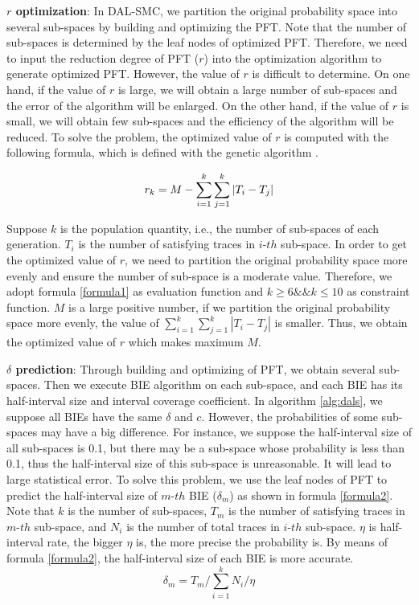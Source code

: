 \textbf{$r$ optimization}: In DAL-SMC, we partition the original probability space into several sub-spaces by building and optimizing the PFT. Note that the number of sub-spaces is determined by the leaf nodes of optimized PFT. Therefore, we need to input the reduction degree of PFT ($r$) into the optimization algorithm to generate optimized PFT. However, the value of $r$ is difficult to determine. On one hand, if the value of $r$ is large, we will obtain a large number of sub-spaces and the error of the algorithm will be enlarged. On the other hand, if the value of $r$ is small, we will obtain few sub-spaces and the efficiency of the algorithm will be reduced. To solve the problem, the optimized value of $r$ is computed with the following formula, which is defined with the genetic algorithm \cite{DBLP:books/daglib/0019871}. 

\begin{equation}
\centering
\label{formula1}
r_k = M - \sum\limits_{i=1}^k \sum\limits_{j=1}^k |T_i - T_j| 
\end{equation}

Suppose $k$ is the population quantity, i.e., the number of sub-spaces of each generation. $T_i$ is the number of satisfying traces in $i$-$th$ sub-space. In order to get the optimized value of $r$, we need to partition the original probability space more evenly and ensure the number of sub-space is a moderate value. Therefore, we adopt formula \ref{formula1} as evaluation function and $k \geq 6 \&\& k \leq 10$ as constraint function. $M$ is a large positive number, if we partition the original probability space more evenly, the value of $\sum\limits_{i=1}^k \sum\limits_{j=1}^k |T_i - T_j|$ is smaller. Thus, we obtain the optimized value of $r$ which makes maximum $M$. 

\textbf{$\delta$ prediction}:
Through building and optimizing of PFT, we obtain several sub-spaces. Then we execute BIE algorithm on each sub-space, and each BIE has its half-interval size and interval coverage coefficient. In algorithm \ref{alg:dals}, we suppose all BIEs have the same $\delta$ and $c$. However, the probabilities of some sub-spaces may have a big difference. For instance, we suppose the half-interval size of all sub-spaces is 0.1, but there may be a sub-space whose probability is less than 0.1, thus the half-interval size of this sub-space is unreasonable. It will lead to large statistical error. To solve this problem, we use the leaf nodes of PFT to predict the half-interval size of $m$-$th$ BIE ($\delta_m$) as shown in formula \ref{formula2}. Note that $k$ is the number of sub-spaces, $T_m$ is the number of satisfying traces in $m$-$th$ sub-space, and $N_i$ is the number of total traces in $i$-$th$ sub-space. $\eta$ is half-interval rate, the bigger $\eta$ is, the more precise the probability is. By means of formula \ref{formula2}, the half-interval size of each BIE is more accurate.
\begin{equation}
\label{formula2}
\delta_m = T_m / \sum\limits_{i=1}^k N_i / \eta
\end{equation}

